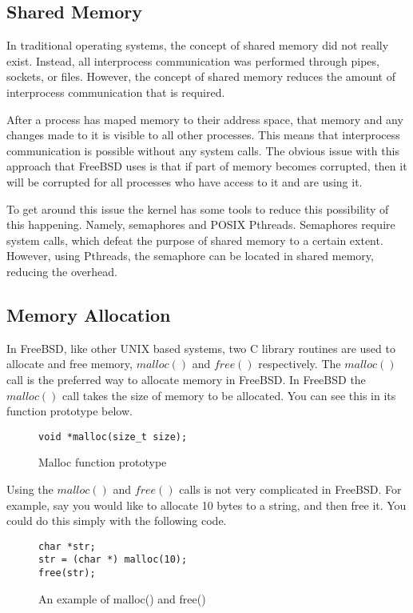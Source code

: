 \documentclass[letterpaper,10pt,titlepage,draftclsnofoot,onecolumn]{IEEEtran}
\begin{document}
\subsection{Shared Memory}
In traditional operating systems, the concept of shared memory did not really exist. Instead, all interprocess communication was performed through pipes, sockets, or files. However, the concept of shared memory reduces the amount of interprocess communication that is required. 

After a process has maped memory to their address space, that memory and any changes made to it is visible to all other processes. This means that interprocess communication is possible without any system calls. The obvious issue with this approach that FreeBSD uses is that if part of memory becomes corrupted, then it will be corrupted for all processes who have access to it and are using it. \cite{freebsd} 

To get around this issue the kernel has some tools to reduce this possibility of this happening. Namely, semaphores and POSIX Pthreads. Semaphores require system calls, which defeat the purpose of shared memory to a certain extent. However, using Pthreads, the semaphore can be located in shared memory, reducing the overhead.

\subsection{Memory Allocation}
In FreeBSD, like other UNIX based systems, two C library routines are used to allocate and free memory, $malloc()$ and $free()$ respectively. The $malloc()$ call is the preferred way to allocate memory in FreeBSD. In FreeBSD the $malloc()$ call takes the size of memory to be allocated. You can see this in its function prototype below.

\begin{figure}[H]
\caption{Malloc function prototype}
\begin{lstlisting}
void *malloc(size_t size);
\end{lstlisting} \cite{freebsd}
\end{figure}

Using the $malloc()$ and $free()$ calls is not very complicated in FreeBSD. For example, say you would like to allocate 10 bytes to a string, and then free it. You could do this simply with the following code.

\begin{figure}[H]
\caption{An example of malloc() and free()}
\begin{lstlisting}
char *str;
str = (char *) malloc(10);
free(str);
\end{lstlisting}
\end{figure}
\end{document}
